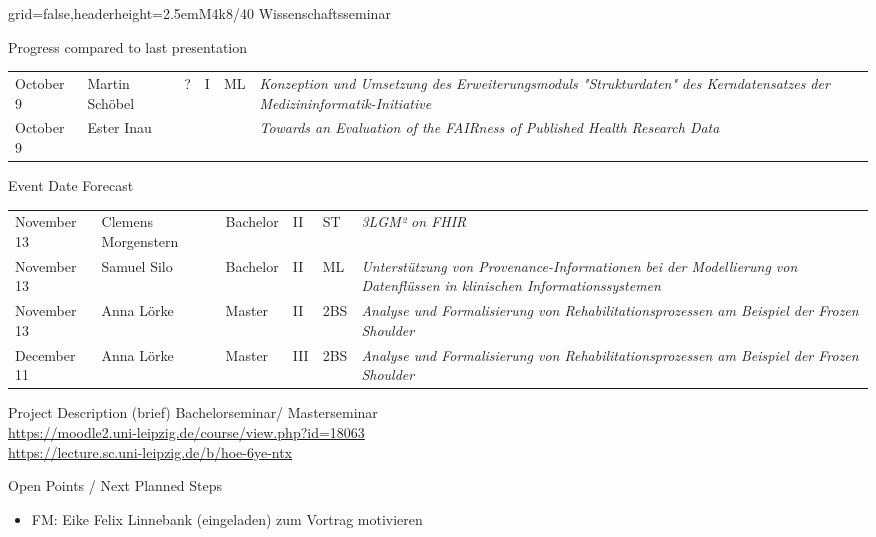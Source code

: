 \documentclass[english]{kiesgrube}
\begin{document}
\begin{poster}{grid=false,headerheight=2.5em}{}{M4k8/40 Wissenschaftsseminar}{}{}
\begin{posterbox}[name=progress,below=person,span=2]{Progress compared to last presentation}
\begin{tabulary}{\textwidth}{lllllL}
October 9 &Martin Schöbel			&?		&I		&ML	&\emph{Konzeption und Umsetzung des Erweiterungsmoduls "Strukturdaten" des Kerndatensatzes der Medizininformatik-Initiative}\\
October 9 &Ester Inau	&		&		&	&\emph{Towards an Evaluation of the FAIRness of Published Health Research Data}\\
\end{tabulary}
\end{posterbox}
\begin{posterbox}[name=event,below=progress,span=2]{Event Date Forecast}
\footnotesize
\begin{tabulary}{\textwidth}{lllllL}
November 13	&Clemens Morgenstern		&Bachelor	&II		&ST	&\emph{3LGM² on FHIR}\\
November 13	&Samuel Silo			&Bachelor	&II		&ML	&\emph{Unterstützung von Provenance-Informationen bei der Modellierung von Datenflüssen in klinischen Informationssystemen}\\
November 13	&Anna Lörke			&Master		&II		&2BS	&\emph{Analyse und Formalisierung von Rehabilitationsprozessen am Beispiel der Frozen Shoulder}\\
December 11	&Anna Lörke			&Master		&III		&2BS	&\emph{Analyse und Formalisierung von Rehabilitationsprozessen am Beispiel der Frozen Shoulder}\\
\end{tabulary}
\end{posterbox}
\begin{posterbox}[name=description,column=1,row=0]{Project Description (brief)}
Bachelorseminar/ Masterseminar\\
\footnotesize
\url{https://moodle2.uni-leipzig.de/course/view.php?id=18063}\\
\url{https://lecture.sc.uni-leipzig.de/b/hoe-6ye-ntx}
\end{posterbox}
\begin{posterbox}[name=open,column=0,below=event]{Open Points / Next Planned Steps}
\small
\begin{itemize}
\item FM: Eike Felix Linnebank (eingeladen) zum Vortrag motivieren

\end{itemize}
\end{posterbox}
\end{poster}
\end{document}
